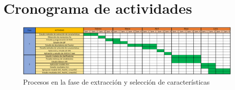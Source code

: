 \chapter{Cronograma de actividades}

\begin{figure}
	\centering
	\captionsetup{justification=centering}
	\includegraphics[scale=0.9]{imagenes/cronograma/crono2.pdf}
	\caption{Procesos en la fase de extracción y selección de características}
	\label{crono:crono}
\end{figure}
